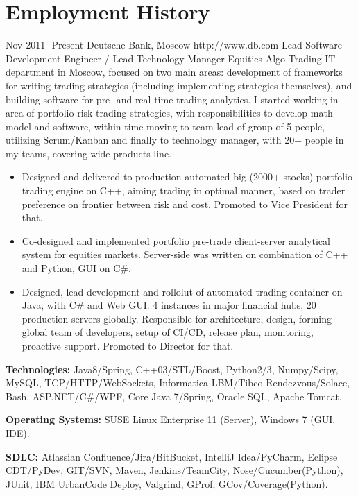 \documentclass[10pt]{article} %
\begin{document}

\section{Employment History}

\job
{Nov 2011 -}{Present}
{Deutsche Bank, Moscow}
{http://www.db.com}
{Lead Software Development Engineer / Lead Technology Manager}
{Equities Algo Trading IT department in Moscow, focused on two main areas: development of frameworks for
writing trading strategies (including implementing strategies themselves), and building software 
for pre- and real-time  trading analytics. I started working in area of portfolio risk trading strategies,
with responsibilities to develop math model and software, within time moving to team lead of group of 5 people,
utilizing Scrum/Kanban and finally to technology manager, with 20+ people in my teams,
covering wide products line.}
{\begin{itemize}
\item{Designed and delivered to production automated big (2000+ stocks) portfolio trading engine on C++,
aiming trading in optimal manner, based on trader preference on frontier between risk and cost. 
Promoted to Vice President for that.}
\item{Co-designed and implemented portfolio pre-trade client-server analytical system for equities markets.
Server-side was written on combination of C++ and Python, GUI on C\#.}
\item{Designed, lead development and rollolut of automated trading container on Java, with C\# and Web GUI.
4 instances  in major financial hubs, 20 production servers globally. Responsible for architecture, design, forming 
global team of developers, setup of CI/CD, release plan, monitoring, proactive support. Promoted to Director for that.}
\end{itemize}}
{\rule{0mm}{5mm}\textbf{Technologies:} Java8/Spring, C++03/STL/Boost, Python2/3, Numpy/Scipy, MySQL, TCP/HTTP/WebSockets,
Informatica LBM/Tibco Rendezvous/Solace, Bash, ASP.NET/C\#/WPF, Core Java 7/Spring, Oracle SQL, Apache Tomcat.\\
\rule{0mm}{5mm}\textbf{Operating Systems:} SUSE Linux Enterprise 11 (Server), Windows 7 (GUI, IDE).\\
\rule{0mm}{5mm}\textbf{SDLC:} Atlassian Confluence/Jira/BitBucket, IntelliJ Idea/PyCharm, Eclipse CDT/PyDev, GIT/SVN,
Maven, Jenkins/TeamCity, Nose/Cucumber(Python), JUnit, IBM UrbanCode Deploy, Valgrind, GProf, GCov/Coverage(Python).
}
\end{document}
